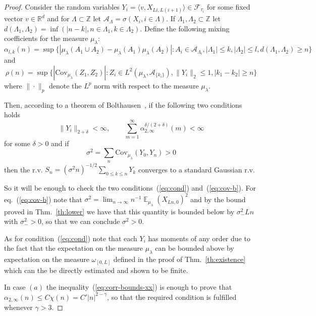\documentclass[a4paper,12pt,reqno]{amsart}
\DeclareMathOperator{\expect}{{\mathbb E}}
\newcommand{\R}{\mathbb{R}}
\newcommand{\Z}{\mathbb{Z}}
\newcommand{\A}{\mathcal{A}}
\newcommand{\F}{\mathcal{F}}
\begin{document}
\begin{proof}
Consider the random variables $Y_i = \langle v, X_{Li,L(i+1)}\rangle
\in \F_{\tau_i}$ for some fixed vector $v \in \R^d$
and for $\Lambda \subset \Z$ let $\A_\Lambda = \sigma(X_i, i \in
\Lambda)$. 
If $\Lambda_1, \Lambda_2 \subset \Z$ let
$d(\Lambda_1,\Lambda_2) = \inf( |n-k|, n \in \Lambda_1, k \in
\Lambda_2)$. Define the following mixing coefficients for the measure
$\mu_\lambda$:
\begin{equation*}
\alpha_{l,k}(n) = \sup\{|\mu_\lambda(A_1 \cup A_2) -\mu_\lambda(A_1)
\mu_\lambda(A_2)| : A_i \in \A_{\Lambda_{i}}, |\Lambda_1| \le k,
|\Lambda_2| \le l, d(\Lambda_1,\Lambda_2) \ge n\}
\end{equation*}
and
\begin{equation*}
\rho(n) = \sup\{|\mathrm{Cov}_{\mu_\lambda}(Z_1,Z_2)| : Z_i \in
L^2(\mu_\lambda,\A_{\{k_i\}}), \|Y_i\|_2 \le 1, |k_1-k_2| \ge n\}  
\end{equation*}
where $\|\cdot\|_p$ denote the $L^p$ norm with respect to the measure
$\mu_\lambda$.

Then, according to a theorem of Bolthausen~\cite{Bolth}, if the
following two conditions holds
\begin{equation}
  \label{eq:cond}
\|Y_i\|_{2+\delta} < \infty, \qquad
\sum_{m=1}^\infty \alpha_{2,\infty}^{\delta/(2+\delta)}(m) < \infty  
\end{equation}
for some $\delta > 0$ and if
\begin{equation}
  \label{eq:cov-b}
\sigma^2 = \sum_{n} \mathrm{Cov}_{\mu_\lambda}(Y_0, Y_n) > 0 
\end{equation}
then the r.v. $S_{n} = (\sigma^2 n)^{-1/2}\sum_{0 \le k
\le n} Y_k$ converges to a standard Gaussian r.v. 

So it will be enough to check the two conditions~(\ref{eq:cond})
and~(\ref{eq:cov-b}). 
For eq.~(\ref{eq:cov-b}) note that
$
\sigma^2  = \lim_{n \to \infty} n^{-1}\expect_{\mu_\lambda} (X_{Ln,0})^2 
$
and by the bound proved in Thm.~\ref{th:lower} we have that this
quantity is bounded below by $\sigma^2_- Ln$ with $\sigma^2_- > 0$, so that we can conclude
$\sigma^2 > 0$.

As for condition~(\ref{eq:cond}) note that each $Y_i$ has moments of
any order due to the fact that the expectation on the measure
$\mu_\lambda$ can be bounded above by expectation on the measure
$\omega_{[0,L]}$ defined in the proof of Thm.~\ref{th:existence} which
can the be directly estimated and shown to be finite. 

In case $(a)$ the inequality~(\ref{eq:corr-bounds-xx}) is enough to
prove that $\alpha_{2,\infty}(n) \le C \chi(n) = C' |n|^{2-\gamma}$, so that the
required condition is fulfilled whenever $\gamma > 3$.


\end{proof}
\end{document}
